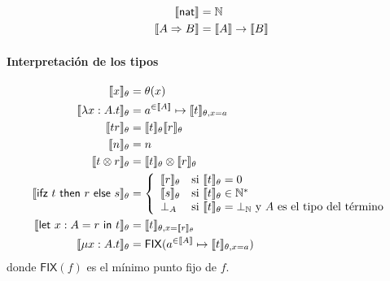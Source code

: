 \documentclass[twoside,a4paper,12pt]{article}
\theoremstyle{definition}
\theoremstyle{remark}
\begin{document}
\begin{align*}
  \sem{\nat}           &= \mathbb N \\
  \sem{A\Rightarrow B} &= \sem A\to\sem B \\
\end{align*}

\paragraph{Interpretación de los tipos}

\begin{align*}
  \semT{x}             &= \theta(x) \\
  \semT{\fun{x:A}t}    &= \funSem{a}{A}{\semT[\theta,x=a]{t}} \\
  \semT{tr}            &= \semT{t} \semT{r}\\
  \semT{n}             &= n \\
  \semT{t\otimes r}    &= \semT{t} \otimes \semT{r} \\
  \semT{\ifz trs}      &=
    \left\{\begin{array}{ll}
      \semT{r} & \textrm{si }\semT{t} = 0 \\
      \semT{s} & \textrm{si }\semT{t} \in \mathbb{N^*} \\
      \bot_{A} & \textrm{si }\semT{t} = \bot_{\mathbb N} \textrm{ y $A$ es el tipo del término}
    \end{array}\right. \\
  \semT{\letl{x:A}{r}{t}} &= \semT[\theta,x=\semT{r}]{t} \\
  \semT{\fix{x:A}{t}}     &= \FIX(\funSem{a}{A}{\semT[\theta,x=a]{t}})
\end{align*}
donde $\mathsf{FIX}(f)$ es el mínimo punto fijo de $f$.
\end{document}
